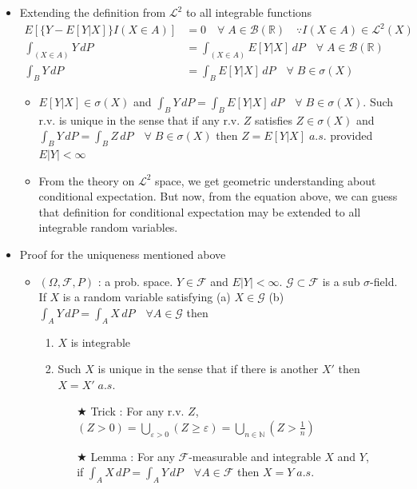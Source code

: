 \documentclass[12pt, A4]{article}
\newcommand{\trick}{$\bigstar$}
\newcommand{\N}{\mathbb{N}}
\newcommand{\R}{\mathbb{R}}
\newcommand{\B}{\mathcal{B}}
\newcommand{\F}{\mathcal{F}}
\newcommand{\LL}{\mathcal{L}}
\begin{document}
\begin{itemize}
\begin{itemize}
\begin{enumerate}
		\end{enumerate}
	\end{itemize}
	\item Extending the definition from $\LL^2$ to all integrable functions
	\begin{align*}
		E[\{Y-E[Y|X]\}I(X\in A)] &=0 \quad \forall \; A\in \B(\R) \quad \because I(X\in A)\in \LL^2(X) \\
		\int_{(X\in A)}Y\, dP &= \int_{(X\in A)}E[Y|X]\, dP \quad \forall \; A\in \B(\R) \\
		\int_B Y\, dP&=\int_B E[Y|X]\, dP \quad \forall \; B\in \sigma(X)
	\end{align*}
	\begin{itemize}
		\item $E[Y|X]\in \sigma(X)$ and $\int_B Y\, dP=\int_B E[Y|X]\, dP \quad \forall \; B\in \sigma(X)$. Such r.v. is unique in the sense that if any r.v. $Z$ satisfies $Z\in \sigma(X)$ and $\int_B Y\, dP=\int_B Z\, dP \quad \forall \; B\in \sigma(X)$ then $Z=E[Y|X]\; a.s.$ provided $E|Y|<\infty$
		\item From the theory on $\LL^2$ space, we get geometric understanding about conditional expectation. But now, from the equation above, we can guess that definition for conditional expectation may be extended to all integrable random variables.
	\end{itemize}
	\item Proof for the uniqueness mentioned above
	\begin{itemize}
		\item $(\Omega, \F, P)$ : a prob. space. $Y\in \F$ and $E|Y|<\infty$. $\mathcal{G}\subset \F$ is a sub $\sigma$-field. If $X$ is a random variable satisfying (a) $X\in \mathcal{G}$ \;(b) $\int_A Y\, dP=\int_A X\, dP \quad \forall A\in \mathcal{G}$ then 
		\begin{enumerate}
			\item $X$ is integrable
			\item Such $X$ is unique in the sense that if there is another $X'$ then $X=X'\; a.s.$
			\begin{itemize}
				\item[\trick] Trick : For any r.v. $Z$, \;$(Z>0)=\bigcup_{\varepsilon>0}(Z\geq \varepsilon)=\bigcup_{n\in \N}(Z>\frac{1}{n})$
				\item[\trick] Lemma : For any $\F$-measurable and integrable $X$ and $Y$, \\if $\int_A X\, dP=\int_A Y \, dP\quad \forall A\in \F$ then $X=Y\; a.s.$
			\end{itemize}

\end{enumerate}
\end{itemize}
\end{itemize}
\end{document}
